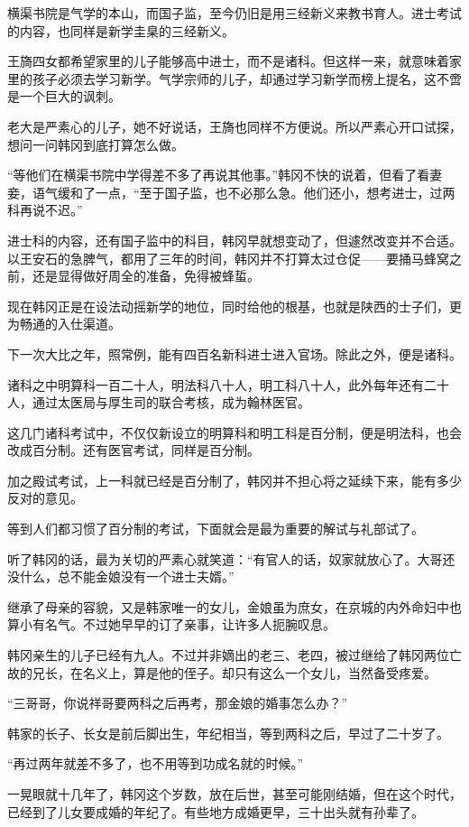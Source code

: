 横渠书院是气学的本山，而国子监，至今仍旧是用三经新义来教书育人。进士考试的内容，也同样是新学圭臬的三经新义。

王旖四女都希望家里的儿子能够高中进士，而不是诸科。但这样一来，就意味着家里的孩子必须去学习新学。气学宗师的儿子，却通过学习新学而榜上提名，这不啻是一个巨大的讽刺。

老大是严素心的儿子，她不好说话，王旖也同样不方便说。所以严素心开口试探，想问一问韩冈到底打算怎么做。

“等他们在横渠书院中学得差不多了再说其他事。”韩冈不快的说着，但看了看妻妾，语气缓和了一点，“至于国子监，也不必那么急。他们还小，想考进士，过两科再说不迟。”

进士科的内容，还有国子监中的科目，韩冈早就想变动了，但遽然改变并不合适。以王安石的急脾气，都用了三年的时间，韩冈并不打算太过仓促——要捅马蜂窝之前，还是显得做好周全的准备，免得被蜂蜇。

现在韩冈正是在设法动摇新学的地位，同时给他的根基，也就是陕西的士子们，更为畅通的入仕渠道。

下一次大比之年，照常例，能有四百名新科进士进入官场。除此之外，便是诸科。

诸科之中明算科一百二十人，明法科八十人，明工科八十人，此外每年还有二十人，通过太医局与厚生司的联合考核，成为翰林医官。

这几门诸科考试中，不仅仅新设立的明算科和明工科是百分制，便是明法科，也会改成百分制。还有医官考试，同样是百分制。

加之殿试考试，上一科就已经是百分制了，韩冈并不担心将之延续下来，能有多少反对的意见。

等到人们都习惯了百分制的考试，下面就会是最为重要的解试与礼部试了。

听了韩冈的话，最为关切的严素心就笑道：“有官人的话，奴家就放心了。大哥还没什么，总不能金娘没有一个进士夫婿。”

继承了母亲的容貌，又是韩家唯一的女儿，金娘虽为庶女，在京城的内外命妇中也算小有名气。不过她早早的订了亲事，让许多人扼腕叹息。

韩冈亲生的儿子已经有九人。不过并非嫡出的老三、老四，被过继给了韩冈两位亡故的兄长，在名义上，算是他的侄子。却只有这么一个女儿，当然备受疼爱。

“三哥哥，你说祥哥要两科之后再考，那金娘的婚事怎么办？”

韩家的长子、长女是前后脚出生，年纪相当，等到两科之后，早过了二十岁了。

“再过两年就差不多了，也不用等到功成名就的时候。”

一晃眼就十几年了，韩冈这个岁数，放在后世，甚至可能刚结婚，但在这个时代，已经到了儿女要成婚的年纪了。有些地方成婚更早，三十出头就有孙辈了。

